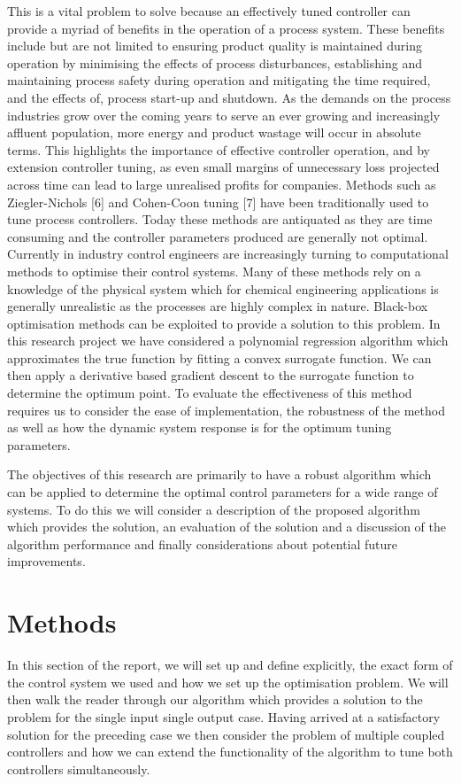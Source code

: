 \documentclass[conference]{IEEEtran}
\theoremstyle{definition}
\begin{document}
\noindent This is a vital problem to solve because an effectively tuned controller can provide a myriad of benefits in the operation of a process system. These benefits include but are not limited to ensuring product quality is maintained during operation by minimising the effects of process disturbances, establishing and maintaining process safety during operation and mitigating the time required, and the effects of, process start-up and shutdown. As the demands on the process industries grow over the coming years to serve an ever growing and increasingly affluent population, more energy and product wastage will occur in absolute terms. This highlights the importance of effective controller operation, and by extension controller tuning, as even small margins of unnecessary loss projected across time can lead to large unrealised profits for companies. Methods such as Ziegler-Nichols [6] and Cohen-Coon tuning [7] have been traditionally used to tune process controllers. Today these methods are  antiquated as they are time consuming and the controller parameters produced are generally not optimal. Currently in industry control engineers are increasingly turning to computational methods to optimise their control systems. Many of these methods rely on a knowledge of the physical system which for chemical engineering applications is generally unrealistic as the processes are highly complex in nature. Black-box optimisation methods can be exploited to provide a solution to this problem. In this research project we have considered a polynomial regression algorithm which approximates the true function by fitting a convex surrogate function. We can then apply a derivative based gradient descent to the surrogate function to determine the optimum point. To evaluate the effectiveness of this method requires us to consider the ease of implementation, the robustness of the method as well as how the dynamic system response is for the optimum tuning parameters.

The objectives of this research are primarily to have a robust algorithm which can be applied to determine the optimal control parameters for a wide range of systems. To do this we will consider a description of the proposed algorithm which provides the solution, an evaluation of the solution and a discussion of the algorithm performance and finally considerations about potential future improvements.
\section{Methods}
\noindent In this section of the report, we will set up and define explicitly, the exact form of the control system we used and how we set up the optimisation problem. We will then walk the reader through our algorithm which provides a solution to the problem for the single input single output case. Having arrived at a satisfactory solution for the preceding case we then consider the problem of multiple coupled controllers and how we can extend the functionality of the algorithm to tune both controllers simultaneously. 
\end{document}
